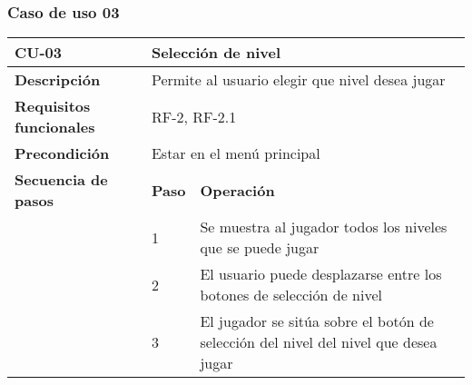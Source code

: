 \subsubsection{Caso de uso 03}
\begin{longtable}{lll}
\textbf{CU-03}                                   & \multicolumn{2}{l}{Selección de nivel}                                                                                                                                                                               \\ \hline
\endfirsthead
%
\endhead
%
\textbf{Descripción}                             & \multicolumn{2}{l}{Permite al usuario elegir que nivel desea jugar}                                                                                                                                                  \\ \hline
\textbf{Requisitos funcionales}                  & \multicolumn{2}{l}{RF-2, RF-2.1}                                                                                                                                                                                     \\ \hline
\textbf{Precondición}                            & \multicolumn{2}{l}{Estar en el menú principal}                                                                                                                                                                       \\ \hline
\multicolumn{1}{l|}{\textbf{Secuencia de pasos}} & \textbf{Paso}                                                          & \textbf{Operación}                                                                                                                          \\ \cline{2-3} 
\multicolumn{1}{l|}{}                            & 1                                                                      & Se muestra al jugador todos los niveles que se puede jugar                                                                                  \\
\multicolumn{1}{l|}{}                            & 2                                                                      & El usuario puede desplazarse entre los botones de selección de nivel                                                                        \\
\multicolumn{1}{l|}{}                            & 3                                                                      & El jugador se sitúa sobre el botón de selección del nivel del nivel que desea jugar                                                         \\

\end{longtable}
